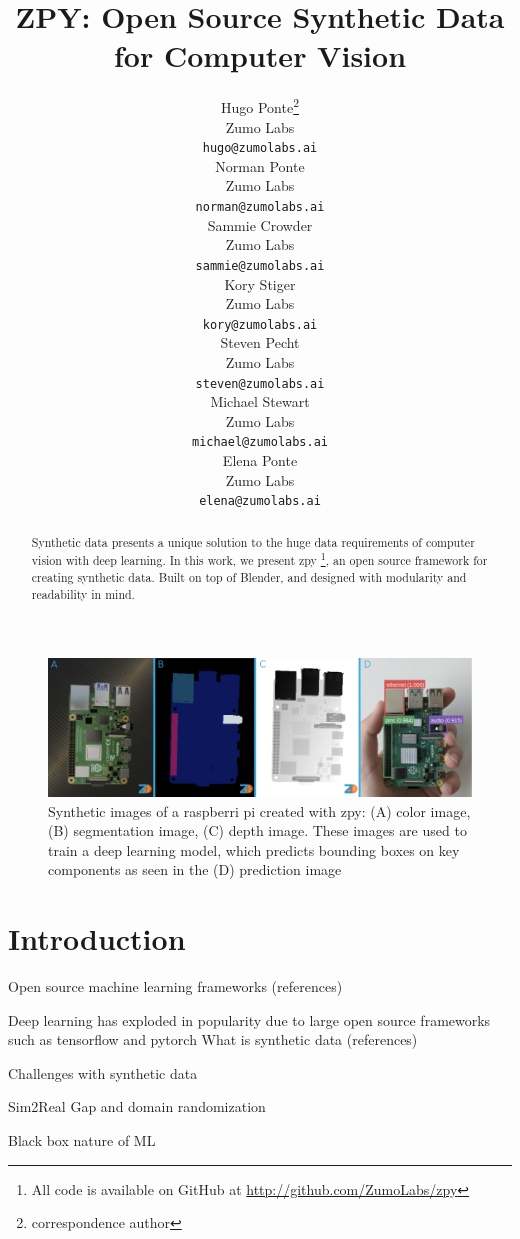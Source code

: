 \documentclass{article}
\title{ZPY: Open Source Synthetic Data for Computer Vision}
\author{
	{\hspace{1mm}Hugo Ponte}\thanks{correspondence author} \\ 
	Zumo Labs \\
	\texttt{hugo@zumolabs.ai} \\
	\And
	{\hspace{1mm}Norman Ponte} \\
	Zumo Labs \\
	\texttt{norman@zumolabs.ai} \\
	\And
	{\hspace{1mm}Sammie Crowder} \\
	Zumo Labs \\
	\texttt{sammie@zumolabs.ai} \\
	\And
	{\hspace{1mm}Kory Stiger} \\
	Zumo Labs \\
	\texttt{kory@zumolabs.ai} \\
	\And
	{\hspace{1mm}Steven Pecht} \\
	Zumo Labs \\
	\texttt{steven@zumolabs.ai} \\
	\And
	{\hspace{1mm}Michael Stewart} \\
	Zumo Labs \\
	\texttt{michael@zumolabs.ai} \\
	\And
	{\hspace{1mm}Elena Ponte} \\
	Zumo Labs \\
	\texttt{elena@zumolabs.ai} \\
}
\date{}
\begin{document}
\maketitle

\begin{abstract}
Synthetic data presents a unique solution to the huge data requirements of computer vision with deep learning. In this work, we present zpy \footnote{All code is available on GitHub at \url{http://github.com/ZumoLabs/zpy}}, an open source framework for creating synthetic data. Built on top of Blender, and designed with modularity and readability in mind.
\end{abstract}


\begin{figure}[!ht]
	\centering
	\includegraphics[width=\textwidth]{cover.png}
	\caption{Synthetic images of a raspberri pi created with zpy: (A) color image, (B) segmentation image, (C) depth image. These images are used to train a deep learning model, which predicts bounding boxes on key components as seen in the (D) prediction image}
	\label{fig:fig1}
\end{figure}

\section{Introduction}
\label{sec:introduction}

Open source machine learning frameworks (references)

Deep learning has exploded in popularity due to large open source frameworks such as tensorflow and pytorch
What is synthetic data (references)

Challenges with synthetic data

Sim2Real Gap and domain randomization

Black box nature of ML
\end{document}
